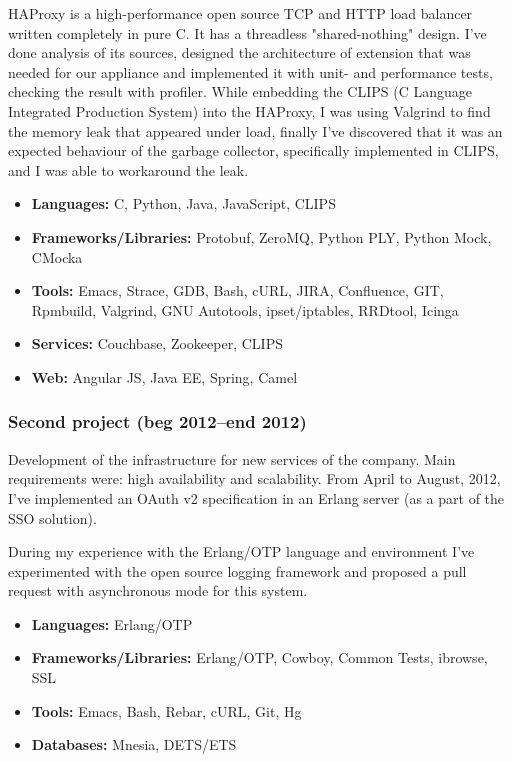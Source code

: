 HAProxy is a high-performance open source TCP and HTTP load balancer
written completely in pure C. It has a threadless "shared-nothing"
design.  I've done analysis of its sources, designed the architecture
of extension that was needed for our appliance and implemented it with
unit- and performance tests, checking the result with profiler. While
embedding the CLIPS (C Language Integrated Production System) into the
HAProxy, I was using Valgrind to find the memory leak that appeared
under load, finally I've discovered that it was an expected behaviour
of the garbage collector, specifically implemented in CLIPS, and I was
able to workaround the leak.

\begin{itemize}[noitemsep, nosep]
  \item \textbf{Languages:} C, Python, Java, JavaScript, CLIPS
  \item \textbf{Frameworks/Libraries:} Protobuf, ZeroMQ, Python PLY,
Python Mock, CMocka
  \item \textbf{Tools:} Emacs, Strace, GDB, Bash, cURL, JIRA,
Confluence, GIT, Rpmbuild, Valgrind, GNU Autotools, ipset/iptables,
RRDtool, Icinga
  \item \textbf{Services:} Couchbase, Zookeeper, CLIPS
  \item \textbf{Web:} Angular JS, Java EE, Spring, Camel
\end{itemize}

\subsubsection*{Second project (beg 2012--end 2012)}

Development of the infrastructure for new services of the
company. Main requirements were: high availability and
scalability. From April to August, 2012, I've implemented an OAuth v2
specification in an Erlang server (as a part of the SSO solution).

During my experience with the Erlang/OTP language and environment I've
experimented with the open source logging framework and proposed a
pull request with asynchronous mode for this system.

\begin{itemize}[noitemsep, nosep]
  \item \textbf{Languages:} Erlang/OTP
  \item \textbf{Frameworks/Libraries:} Erlang/OTP, Cowboy, Common
Tests, ibrowse, SSL
  \item \textbf{Tools:} Emacs, Bash, Rebar, cURL, Git, Hg
  \item \textbf{Databases:} Mnesia, DETS/ETS
\end{itemize}

